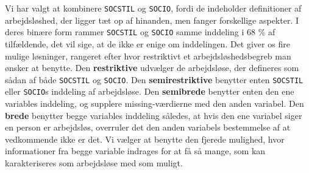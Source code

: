 Vi har valgt at kombinere \texttt{SOCSTIL} og \texttt{SOCIO}, fordi de indeholder definitioner af arbejdsløshed, der ligger tæt op af hinanden, men fanger forskellige aspekter. I deres binære form rammer \texttt{SOCSTIL} og \texttt{SOCIO} samme inddeling i 68 \% af tilfældende, det vil sige, at de ikke er enige om inddelingen. Det giver os fire mulige løsninger, rangeret efter hvor restriktivt et arbejdsløshedsbegreb man ønsker at benytte. Den \textbf{restriktive} udvælger de arbejdsløse, der defineres som sådan af både \texttt{SOCSTIL} og \texttt{SOCIO}. Den \textbf{semirestriktive} benytter enten \texttt{SOCSTIL} eller \texttt{SOCIO}s inddeling af arbejdsløse. Den \textbf{semibrede} benytter enten den ene variables inddeling, og supplere missing-værdierne med den anden variabel. Den \textbf{brede} benytter begge variables inddeling således, at hvis den ene variabel siger en person er arbejdsløs, overruler det den anden variabels bestemmelse af at vedkommende ikke er det. Vi vælger at benytte den fjerede mulighed, hvor informationer fra begge variable indrages for at få så mange, som kan karakteriseres som arbejdsløse med som muligt.

